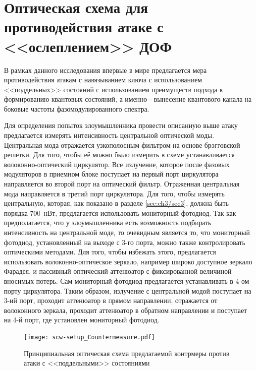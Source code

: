 \section{Оптическая схема для противодействия атаке с <<ослеплением>> ДОФ} \label{ch:ch3/sec4}

В рамках данного исследования впервые в мире предлагается мера противодействия атакам с навязыванием ключа с использованием <<поддельных>> состояний с использованием преимуществ подхода к формированию квантовых состояний, а именно - вынесение квантового канала на боковые частоты фазомодулированного спектра.

Для определения попыток злоумышленника провести описанную выше атаку предлагается измерять интенсивность центральной оптической моды. Центральная мода отражается узкополосным фильтром на основе брэгговской решетки. Для того, чтобы её можно было измерить в схеме устанавливается волоконно-оптический циркулятор. Все излучение, которое после фазовых модуляторов в приемном блоке поступает на первый порт циркулятора направляется во второй порт на оптический фильтр. Отраженная центральная мода направляется в третий порт циркулятора. Для того, чтобы измерять центральную, которая, как показано в разделе \ref{sec:ch3/sec3}, должна быть порядка 700~нВт, предлагается использовать мониторный фотодиод. Так как предполагается, что у злоумышленника есть возможность подбирать интенсивность на центральной моде, то очевидным является то, что мониторный фотодиод, установленный на выходе с 3-го порта, можно также контролировать оптическими методами. Для того, чтобы избежать этого, предлагается использовать волоконно-оптическое зеркало, например широко доступное зеркало Фарадея, и пассивный оптический аттенюатор с фиксированной величиной вносимых потерь. Сам мониторный фотодиод предлагается устанавливать в 4-ом порту циркулятора. Таким образом, излучение с центральной модой поступает на 3-ий порт, проходит аттенюатор в прямом направлении, отражается от волоконного зеркала, проходит аттенюатор в обратном направлении и поступает на 4-й порт, где установлен мониторный фотодиод.         
 \begin{figure}[ht]
  \centering
  \texttt{[image: scw-setup\_Countermeasure.pdf]}
  \caption{Принципиальная оптическая схема предлагаемой контрмеры против атаки с <<поддельными>> состояниями}
  \label{fig:countermeasure}
\end{figure}

\pagebreak

